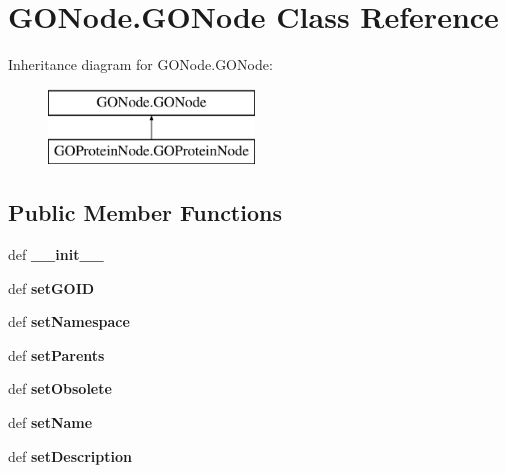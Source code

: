 \hypertarget{class_g_o_node_1_1_g_o_node}{
\section{GONode.GONode Class Reference}
\label{class_g_o_node_1_1_g_o_node}
}
Inheritance diagram for GONode.GONode:\begin{figure}[H]
\begin{center}
\leavevmode
\includegraphics[height=2.000000cm]{class_g_o_node_1_1_g_o_node}
\end{center}
\end{figure}
\subsection*{Public Member Functions}
\begin{DoxyCompactItemize}
\item 
\hypertarget{class_g_o_node_1_1_g_o_node_aed2500c2cbac29cc9793c37396b75928}{
def {\bfseries \_\-\_\-init\_\-\_\-}}
\label{class_g_o_node_1_1_g_o_node_aed2500c2cbac29cc9793c37396b75928}

\item 
\hypertarget{class_g_o_node_1_1_g_o_node_a7bc51e25200c46ad8a7557992f90f7ca}{
def {\bfseries setGOID}}
\label{class_g_o_node_1_1_g_o_node_a7bc51e25200c46ad8a7557992f90f7ca}

\item 
\hypertarget{class_g_o_node_1_1_g_o_node_a0590505c8573df5ef3b6e8290e821de1}{
def {\bfseries setNamespace}}
\label{class_g_o_node_1_1_g_o_node_a0590505c8573df5ef3b6e8290e821de1}

\item 
\hypertarget{class_g_o_node_1_1_g_o_node_adf32cb452b5eff47a658d83ef9ce9381}{
def {\bfseries setParents}}
\label{class_g_o_node_1_1_g_o_node_adf32cb452b5eff47a658d83ef9ce9381}

\item 
\hypertarget{class_g_o_node_1_1_g_o_node_a038f04eff9f5d8486280bc70887515fa}{
def {\bfseries setObsolete}}
\label{class_g_o_node_1_1_g_o_node_a038f04eff9f5d8486280bc70887515fa}

\item 
\hypertarget{class_g_o_node_1_1_g_o_node_ab48dc024009773f22884b5a7c75d17cd}{
def {\bfseries setName}}
\label{class_g_o_node_1_1_g_o_node_ab48dc024009773f22884b5a7c75d17cd}

\item 
\hypertarget{class_g_o_node_1_1_g_o_node_a6da2fec8371255c0728c3bed095ab4f9}{
def {\bfseries setDescription}}
\label{class_g_o_node_1_1_g_o_node_a6da2fec8371255c0728c3bed095ab4f9}

\end{DoxyCompactItemize}
